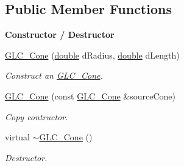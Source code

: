\subsection*{Public Member Functions}
\begin{Indent}{\bf Constructor / Destructor}\par
\begin{DoxyCompactItemize}
\item 
\hyperlink{class_g_l_c___cone_acce52ca7e5a352611feb61f595eab25c}{G\-L\-C\-\_\-\-Cone} (\hyperlink{_super_l_u_support_8h_a8956b2b9f49bf918deed98379d159ca7}{double} d\-Radius, \hyperlink{_super_l_u_support_8h_a8956b2b9f49bf918deed98379d159ca7}{double} d\-Length)
\begin{DoxyCompactList}\small\item\em Construct an \hyperlink{class_g_l_c___cone}{G\-L\-C\-\_\-\-Cone}. \end{DoxyCompactList}\item 
\hyperlink{class_g_l_c___cone_a0aadf423da610882a24875dd887c8668}{G\-L\-C\-\_\-\-Cone} (const \hyperlink{class_g_l_c___cone}{G\-L\-C\-\_\-\-Cone} \&source\-Cone)
\begin{DoxyCompactList}\small\item\em Copy contructor. \end{DoxyCompactList}\item 
virtual \hyperlink{class_g_l_c___cone_a2f06cf8f70670bee1c285afe6b4253b6}{$\sim$\-G\-L\-C\-\_\-\-Cone} ()
\begin{DoxyCompactList}\small\item\em Destructor. \end{DoxyCompactList}\end{DoxyCompactItemize}
\end{Indent}
